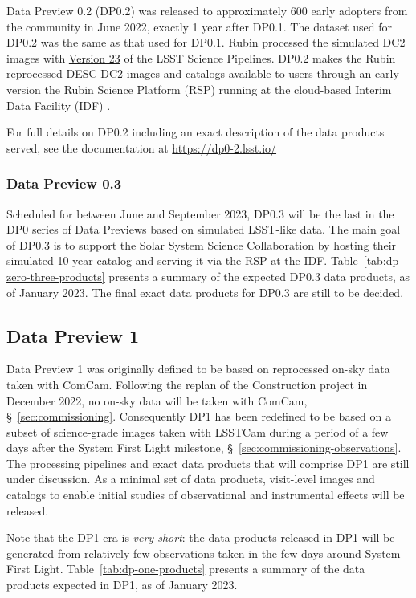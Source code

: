 Data Preview 0.2 (DP0.2) was released to approximately 600 early adopters from the community in June 2022, exactly 1 year after DP0.1. 
The dataset used for DP0.2 was the same as that used for DP0.1.
Rubin processed the simulated DC2 images with \href{https://pipelines.lsst.io/v/v23_0_0/index.html}{Version 23} of the LSST Science Pipelines. 
DP0.2 makes the Rubin reprocessed DESC DC2 images and catalogs available to users through an early version the Rubin Science Platform (RSP) running at the cloud-based Interim Data Facility (IDF) . 

For full details on DP0.2 including an exact description of the data products served, see the documentation at \url{https://dp0-2.lsst.io/}

\subsubsection{Data Preview 0.3}

Scheduled for between June and September 2023, DP0.3 will be the last in the DP0 series of Data Previews based on simulated LSST-like data. 
The main goal of DP0.3 is to support the Solar System Science Collaboration by hosting their simulated 10-year catalog and serving it via the RSP at the IDF. 
Table~\ref{tab:dp-zero-three-products} presents a summary of the expected DP0.3 data products, as of January 2023.
The final exact data products for DP0.3 are still to be decided. 

\subsection{Data Preview 1}

Data Preview 1 was originally defined to be based on reprocessed on-sky data taken with ComCam.
Following the replan of the Construction project in December 2022, no on-sky data will be taken with ComCam, \S~\ref{sec:commissioning}.
Consequently DP1 has been redefined to be based on a subset of science-grade images taken with LSSTCam during a period of a few days after the System First Light milestone, \S~\ref{sec:commissioning-observations}.
The processing pipelines and exact data products that will comprise DP1 are still under discussion. 
As a minimal set of data products, visit-level images and catalogs to enable initial studies of observational and instrumental effects will be released. 

Note that the DP1 era is \textit{very short}: the data products released in DP1 will be generated from relatively few observations taken in the few days around System First Light.
Table~\ref{tab:dp-one-products} presents a summary of the data products expected in DP1, as of January 2023.


